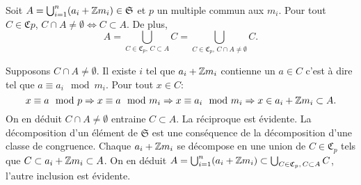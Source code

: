  \begin{propn} \label{prop:DecompUnionClasses}
  Soit $A=\bigcup_{i=1}^n(a_i + \mathbb{Z} m_i) \in \mathfrak{S}$ et $p$ un multiple commun aux $m_i$.\newline
  Pour tout $C \in \mathfrak{C}p$, $C \cap A \neq \emptyset \Leftrightarrow C \subset A$. De plus,
  \begin{displaymath}
   A = \bigcup_{C \in \mathfrak{C}_p,\, C\subset A} C = \bigcup_{C \in \mathfrak{C}_p,\, C\cap A \neq \emptyset} C.
  \end{displaymath}
 \end{propn}
 \begin{demo}
  Supposons $C\cap A \neq \emptyset$. Il existe $i$ tel que $a_i + \mathbb{Z} m_i$ contienne un $a \in C$ c'est à dire tel que $a \equiv a_i \mod m_i$. Pour tout $x \in C$:
  \begin{displaymath}
   x \equiv a \mod p \Rightarrow x \equiv a \mod m_i \Rightarrow x \equiv a_i \mod m_i \Rightarrow x \in a_i + \mathbb{Z} m_i \subset A.
  \end{displaymath}
  On en déduit $C \cap A \neq \emptyset$ entraine $C \subset A$. La réciproque est évidente.\newline
  La décomposition d'un élément de $\mathfrak{S}$ est une conséquence de la décomposition d'une classe de congruence. Chaque $a_i + \mathbb{Z} m_i$ se décompose en une union de $C\in \mathfrak{C}_p$ tels que $C \subset a_i + \mathbb{Z} m_i \subset A$. On en déduit $A = \bigcup_{i=1}^n(a_i + \mathbb{Z} m_i) \subset \bigcup_{C \in \mathfrak{C}_p,\, C\subset A} C$, l'autre inclusion est évidente.
 \end{demo}

